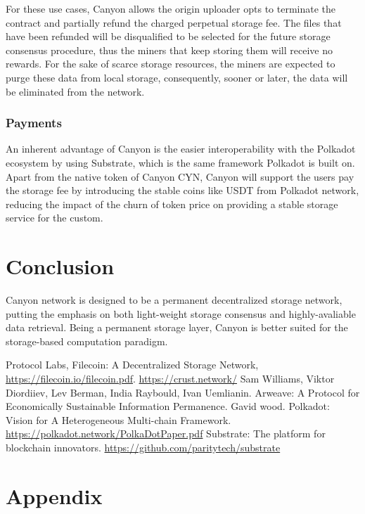 \documentclass[]{article}
\begin{document}
For these use cases, Canyon allows the origin uploader opts to terminate the contract and partially refund the charged perpetual storage fee. The files that have been refunded will be disqualified to be selected for the future storage consensus procedure, thus the miners that keep storing them will receive no rewards. For the sake of scarce storage resources, the miners are expected to purge these data from local storage, consequently, sooner or later, the data will be eliminated from the network.

\subsubsection{Payments}

An inherent advantage of Canyon is the easier interoperability with the Polkadot\cite{ref4} ecosystem by using Substrate\cite{ref5}, which is the same framework Polkadot is built on. Apart from the native token of Canyon CYN, Canyon will support the users pay the storage fee by introducing the stable coins like USDT from Polkadot network, reducing the impact of the churn of token price on providing a stable storage service for the custom.

\section{Conclusion}

Canyon network is designed to be a permanent decentralized storage network, putting the emphasis on both light-weight storage consensus and highly-avaliable data retrieval. Being a permanent storage layer, Canyon is better suited for the storage-based computation paradigm.

\begin{thebibliography}{99}
Protocol Labs, Filecoin: A Decentralized Storage Network, \url{https://filecoin.io/filecoin.pdf}.
\url{https://crust.network/}
Sam Williams, Viktor Diordiiev, Lev Berman, India Raybould, Ivan Uemlianin. Arweave: A Protocol for Economically Sustainable Information Permanence.
Gavid wood. Polkadot: Vision for A Heterogeneous Multi-chain Framework. \url{https://polkadot.network/PolkaDotPaper.pdf}
Substrate: The platform for blockchain innovators. \url{https://github.com/paritytech/substrate}
\end{thebibliography}

\appendix
\section{Appendix}
\end{document}
